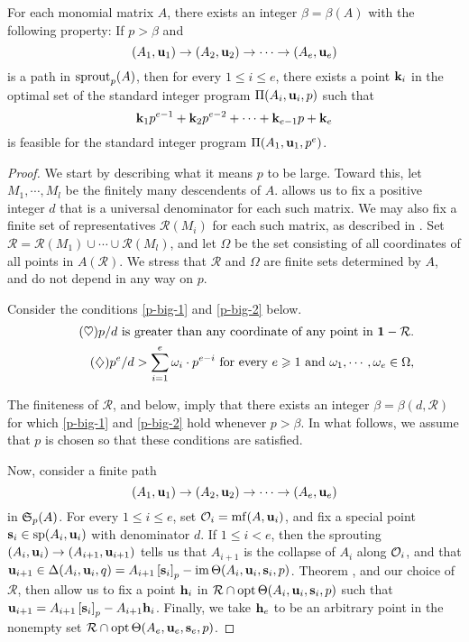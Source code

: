 \documentclass[11pt]{amsart}
\newcommand{\denom}{d}
\newcommand{\fsr}{\mathcal{R}}
\begin{document}
\newpage



\begin{theorem}
\label{ILL: T}
   For each monomial matrix $A$, there exists an integer $\beta = \beta(A)$ with the following property\textup:
   If $p>\beta$ and \[ (A_1, \mathbf{u}_1) \to (A_2, \mathbf{u}_2) \to \cdots \to (A_e, \mathbf{u}_e)\] is a path in $\operatorname{sprout}_p(A)$, then for every $1 \leq i \leq e$, there exists a point $\mathbf{k}_i$ in the optimal set of the standard integer program $\Pi(A_i, \mathbf{u}_i,p)$  such that
 \[ \mathbf{k}_1 p^{e-1} + \mathbf{k}_2 p^{e-2} + \cdots + \mathbf{k}_{e-1} p + \mathbf{k}_e\]
 is feasible for the standard integer program $\Pi(A_1, \mathbf{u}_1, p^e)$.
 \end{theorem}

\begin{proof} We start by describing what it means $p$ to be large.  Toward this, let $M_1, \cdots, M_l$ be the finitely many descendents of  $A$.   allows us to fix a positive integer $\denom$ that is a universal denominator for each such matrix.  We may also fix a finite set of representatives $\fsr(M_i)$ for each such matrix, as described in .  Set $\fsr = \fsr(M_1) \cup \cdots \cup \fsr(M_l)$, and let $\Omega$ be the set consisting of all coordinates of all points in $A(\fsr)$.  We stress that $\fsr$ and $\Omega$ are finite sets determined by $A$, and do not depend in any way on $p$.

Consider the conditions \eqref{p-big-1} and \eqref{p-big-2} below.
%
\begin{align}
\tag{$\heartsuit$} \label{p-big-1}
\text{$p/\denom$ is greater than any coordinate of any point in $\vv{1} - \fsr$.} \\
 \label{p-big-2}
\tag{$\diamondsuit$}\text{$p^e / \denom > \sum_{i=1}^e \omega_i \cdot p^{e-i}$ for every $e \geq 1$ and $\omega_1, \cdots, \omega_e \in \Omega$,}
\end{align}

The finiteness of $\fsr$,  and  below, imply that there exists an integer $\beta = \beta(\denom, \fsr)$ for which \eqref{p-big-1} and \eqref{p-big-2} hold whenever $p > \beta$.  In what follows, we assume that $p$ is chosen so that these conditions are satisfied.

Now, consider a finite path \[ (A_1, \mathbf{u}_1) \to (A_2, \mathbf{u}_2) \to \cdots \to (A_e, \mathbf{u}_e) \] in $\mathfrak{S}_p(A)$.  For every $1 \leq i \leq e$, set $\mathcal{O}_i = \operatorname{mf}(A, \mathbf{u}_i)$, and fix a special point $\mathbf{s}_i \in \operatorname{sp}(A_i, \mathbf{u}_i)$ with denominator $\denom$.  If $1 \leq i < e$, then the sprouting $(A_i, \mathbf{u}_i) \to (A_{i+1}, \mathbf{u}_{i+1})$ tells us that $A_{i+1}$ is the collapse of $A_i$ along $\mathcal{O}_i$, and that $\mathbf{u}_{i+1} \in \Delta(A_i, \mathbf{u}_i, q) = A_{i+1} \left[ \mathbf{s}_i \right]_p - \operatorname{im}  \Theta( A_i, \mathbf{u}_i, \mathbf{s}_i, p)$.  Theorem , and our choice of $\fsr$, then allow us to fix a point $\mathbf{h}_i$ in $\fsr \cap \opt \ip ( A_i, \vv{u}_i, \vv{s}_i, p)$ such that
$\mathbf{u}_{i+1} = A_{i+1} \left[ \mathbf{s}_i \right]_p - A_{i+1} \mathbf{h}_i$.  Finally, we take $\mathbf{h}_e$ to be an arbitrary point in the nonempty set $\fsr \cap \opt \ip ( A_e, \vv{u}_e, \vv{s}_e, p)$.



\end{proof}
\end{document}
